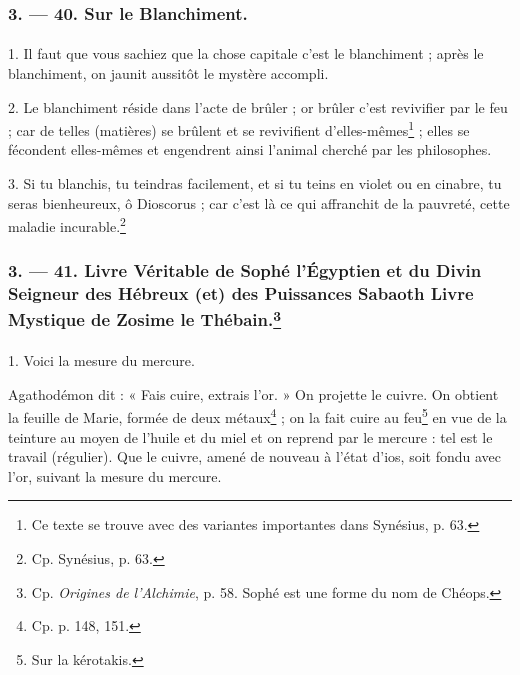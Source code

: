 \documentclass[landscape, a4paper, 11pt, oneside, polutonikogreek, french]{article}
\begin{document}
\bigskip
\centerline{\EightStarTaper}
\centerline{\EightStarTaper\EightStarTaper}
\bigskip

\subsubsection{3. --- 40. Sur le Blanchiment.}
\paragraph{}
1. Il faut que vous sachiez que la chose capitale c'est le blanchiment ; après le blanchiment, on jaunit aussitôt le mystère accompli.

2. Le blanchiment réside dans l'acte de brûler ; or brûler c'est revivifier par le feu ; car de telles (matières) se brûlent et se revivifient d'elles-mêmes\footnote{Ce texte se trouve avec des variantes importantes dans Synésius, p. 63.} ; elles se fécondent elles-mêmes et engendrent ainsi l'animal cherché par les philosophes.

3. Si tu blanchis, tu teindras facilement, et si tu teins en violet ou en cinabre, tu seras bienheureux, ô Dioscorus ; car c'est là ce qui affranchit de la pauvreté, cette maladie incurable.\footnote{Cp. Synésius, p. 63.}

\bigskip
\centerline{\EightStarTaper}
\centerline{\EightStarTaper\EightStarTaper}
\bigskip

\subsubsection[3. --- 41. Livre Véritable de Sophé l'Égyptien et du Divin Seigneur des Hébreux (et) des Puissances Sabaoth Livre Mystique de Zosime le Thébain.]{3. --- 41. Livre Véritable de Sophé l'Égyptien et du Divin Seigneur des Hébreux (et) des Puissances Sabaoth Livre Mystique de Zosime le Thébain.\footnote{Cp. \emph{Origines de l'Alchimie}, p. 58. Sophé est une forme du nom de Chéops.}}
\paragraph{}
1. Voici la mesure du mercure.

Agathodémon dit : « Fais cuire, extrais l'or. » On projette le cuivre. On obtient la feuille de Marie, formée de deux métaux\footnote{Cp. p. 148, 151.} ; on la fait cuire au feu\footnote{Sur la kérotakis.} en vue de la teinture au moyen de l'huile et du miel et on reprend par le mercure : tel est le travail (régulier). Que le cuivre, amené de nouveau à l'état d'ios, soit fondu avec l'or, suivant la mesure du mercure.
\end{document}
